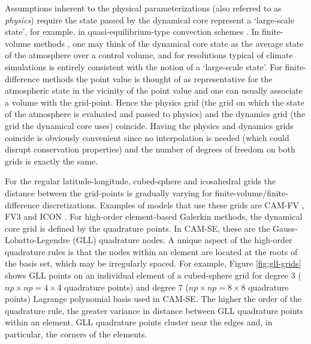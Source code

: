 \documentclass[twocol]{ametsoc}
\begin{document}
Assumptions inherent to the physical parameterizations (also referred to as {\em{physics}}) require the state passed by the dynamical core represent a `large-scale state', for example, in quasi-equilibrium-type convection schemes \citep{AS1974JAS,PC2008JAS}. In finite-volume methods {\color{red}\citep[e.g., ][]{L2004MWR}{}}, one may think of the dynamical core state as the average state of the atmosphere over a control volume, and for resolutions typical of climate simulations is entirely consistent with the notion of a `large-scale state'. For finite-difference methods {\color{red}\citep[e.g., ][]{SETAL983MWR}{}} the point value is thought of as representative for the atmospheric state in the vicinity of the point value and one can usually associate a volume with the grid-point. Hence the physics grid (the grid on which the state of the atmosphere is evaluated and passed to physics) and the dynamics grid (the grid the dynamical core uses) coincide. Having the physics and dynamics grids coincide is obviously convenient since no interpolation is needed (which could disrupt conservation properties) and the number of degrees of freedom on both grids is exactly the same. 

For the regular latitude-longitude, cubed-sphere and icosahedral grids the distance between the grid-points is gradually varying for finite-volume/finite-difference discretizations. {\color{red}Examples of models that use these grids are CAM-FV \citep[latitude-longitude grid, ][]{L2004MWR}, FV3 \citep[cubed-sphere grid, ][]{PL2007JCP} and ICON \citep[icosahedral grid, ][]{WETAL2013GMD}.{}} For high-order element-based Galerkin methods, the dynamical core grid is defined by the quadrature points. In CAM-SE, these are the Gauss-Lobatto-Legendre (GLL) quadrature nodes. A unique aspect of the high-order quadrature rules is that the nodes within an element are located at the roots of the basis set, which may be irregularly spaced. For example, Figure \ref{fig:gll-grids} shows GLL points on an individual element of a cubed-sphere grid for degree 3 {\color{red}($np\times np=4\times 4$ quadrature points){}} and degree 7 {\color{red}($np\times np=8\times 8$ quadrature points){}} Lagrange polynomial basis used in CAM-SE. The higher the order of the quadrature rule, {\color{red}the greater variance in distance between GLL quadrature points within an element.{}} GLL quadrature points cluster near the edges and, in particular, the corners of the elements.
\end{document}

